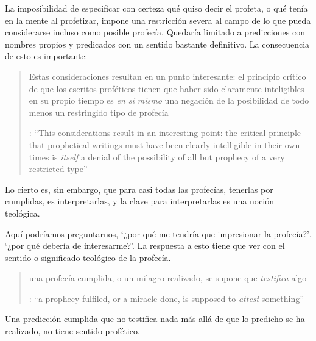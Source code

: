 La imposibilidad de especificar con certeza qué quiso decir el profeta, o qué tenía en la mente al profetizar, impone una restricción severa al campo de lo que pueda considerarse incluso como posible profecía. Quedaría limitado a predicciones con nombres propios y predicados con un sentido bastante definitivo. La consecuencia de esto es importante: \blockquote[{\cite[31]{anscombe2008faith:prophandmi}}: \enquote{This considerations result in an interesting point: the critical principle that prophetical writings must have been clearly intelligible in their own times is \emph{itself} a denial of the possibility of all but prophecy of a very restricted type}]{Estas consideraciones resultan en un punto interesante: el principio crítico de que los escritos proféticos tienen que haber sido claramente inteligibles en su propio tiempo es \emph{en sí mismo} una negación de la posibilidad de todo menos un restringido tipo de profecía}. Lo cierto es, sin embargo, que para casi todas las profecías, tenerlas por cumplidas, es interpretarlas, y la clave para interpretarlas es una noción teológica.

Aquí podríamos preguntarnos, \enquote*{¿por qué me tendría que impresionar la profecía?}, \enquote*{¿por qué debería de interesarme?}. La respuesta a esto tiene que ver con el sentido o significado teológico de la profecía. \blockquote[{\cite[32]{anscombe2008faith:prophandmi}}: \enquote{a prophecy fulfiled, or a miracle done, is supposed to \emph{attest} something}]{una profecía cumplida, o un milagro realizado, se supone que \emph{testifica} algo}. Una predicción cumplida que no testifica nada más allá de que lo predicho se ha realizado, no tiene sentido profético.


